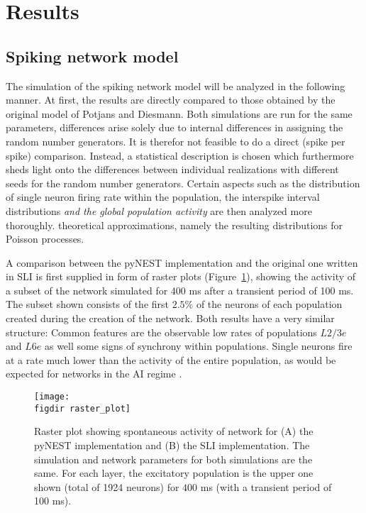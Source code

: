 \section{Results}
\label{sec:results}

\subsection{Spiking network model}
The simulation of the spiking network model will be analyzed in the following manner. 
At first, the results are directly compared to those obtained by the original 
model of Potjans and Diesmann. Both simulations are run for the same parameters, 
differences arise solely due to internal differences in assigning the random 
number generators. It is therefor not feasible to do a direct (spike per spike) 
comparison. Instead, a statistical description is chosen which furthermore sheds light
onto the differences between individual realizations with different seeds for the 
random number generators. Certain aspects such as
the distribution of single neuron firing rate within the population, 
the interspike interval distributions 
\emph{and the global population activity} 
are then analyzed more thoroughly. 
theoretical approximations, namely the resulting distributions 
for Poisson processes.

A comparison between the pyNEST implementation and the original one written in SLI
is first supplied in form of raster plots (Figure~\ref{fig:raster_plot}), 
showing the activity of a subset of the network simulated for 400 ms 
after a transient period of 100 ms. The subset shown consists of the first 
$2.5 \%$ of the neurons of each population created during the creation of the network. 
Both results have a very similar structure: Common features are the observable low 
rates of populations $L2/3e$ and $L6e$ as well some signs of synchrony within populations. 
Single neurons fire at a rate much lower than the activity of the 
entire population, as would be expected for networks in the AI regime \cite{brunel2000}. 
\begin{figure}[htpb]
    \centering
    \texttt{[image: \\figdir raster\_plot]}
    \caption{Raster plot showing spontaneous activity of network for 
        (A) the pyNEST implementation and (B) the SLI implementation.
        The simulation and network parameters for both simulations are 
        the same. 
        For each layer, the excitatory population is the upper one shown 
        (total of 1924 neurons) for $400$ ms (with a transient period of 100 ms). 
    }
    \label{fig:raster_plot}
\end{figure}

